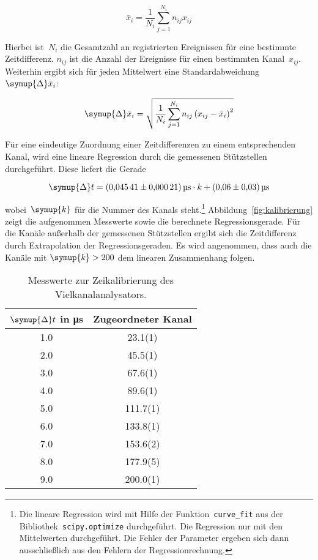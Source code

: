 \begin{equation}
  \bar{x}_i=\frac{1}{N_i}\sum_{j=1}^{N_i}n_{ij}x_{ij}
  \label{eq:kanal_mittelwert}
\end{equation}

Hierbei ist~$N_i$ die Gesamtzahl an registrierten Ereignissen für eine bestimmte
Zeitdifferenz. $n_{ij}$ ist die Anzahl der Ereignisse für einen bestimmten
Kanal~$x_{ij}$. Weiterhin ergibt sich für jeden Mittelwert eine
Standardabweichung~$\symup{\Delta}\bar{x}_i$:

\begin{equation}
  \symup{\Delta}\bar{x}_i=\sqrt{\frac{1}{N_i}\sum_{j=1}^{N_i}n_{ij}\left(x_{ij}-\bar{x}_i\right)^2}
  \label{eq:kanal_standardabweichung}
\end{equation}

Für eine eindeutige Zuordnung einer Zeitdifferenzen zu einem entsprechenden Kanal,
wird eine lineare Regression durch die gemessenen Stützstellen durchgeführt. Diese
liefert die Gerade

\begin{equation}
  \symup{\Delta}t=\SI{0.04541(21)}{\micro\second}\cdot k+\SI{0.06(3)}{\micro\second}
  \label{eq:kalibrierung}
\end{equation}

wobei~$\symup{k}$ für die Nummer des Kanals steht.\footnote{Die lineare
Regression wird mit Hilfe der Funktion~\texttt{curve\_fit} aus der
Bibliothek~\texttt{scipy.optimize} durchgeführt. Die Regression nur mit den
Mittelwerten durchgeführt. Die Fehler der Parameter ergeben sich dann ausschließlich
aus den Fehlern der Regressionrechnung.} Abbildung~\ref{fig:kalibrierung} zeigt
die aufgenommen Messwerte sowie die berechnete Regressionsgerade. Für die Kanäle
außerhalb der gemessenen Stützstellen ergibt sich die Zeitdifferenz durch Extrapolation
der Regressionsgeraden. Es wird angenommen, dass auch die Kanäle mit $\symup{k}>200$
dem linearen Zusammenhang folgen.

\begin{table}[htb]
  \centering
  \caption{Messwerte zur Zeikalibrierung des Vielkanalanalysators.}
  \begin{tabular}{S[table-format = 2.1] S[table-format = 3.1(1)]}
    \toprule
    {$\symup{\Delta}t$ in \si{\micro\second}} & {Zugeordneter Kanal} \\
     &  23.1(1) \\
    2.0 &  45.5(1) \\
    3.0 &  67.6(1) \\
    4.0 &  89.6(1) \\
    5.0 & 111.7(1) \\
    6.0 & 133.8(1) \\
    7.0 & 153.6(2) \\
    8.0 & 177.9(5) \\
    9.0 & 200.0(1) \\
    \bottomrule
  \end{tabular}
  \label{tab:kalibrierung}
\end{table}


